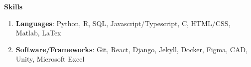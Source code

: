\documentclass[letterpaper,11pt]{article}
\newlength{\outerbordwidth}
\newcommand{\resheading}[1]{\vspace{0pt} %
  \parbox{\textwidth}{\setlength{\FrameSep}{\outerbordwidth}
    \begin{shaded}
\setlength{\fboxsep}{0pt}\framebox[\textwidth][l]{\setlength{\fboxsep}{3.5pt}\fcolorbox{shadecolorB}{shadecolorB}{\textbf{\sffamily{\mbox{~}\makebox[7.262in][l]{\large #1} \vphantom{p\^{E}}}}}} %
    \end{shaded}
  }\vspace{-7pt} %
}
\begin{document}
\vspace{-10pt}

\begin{mybox}
	\hspace{-8pt} \textbf{Skills}
\end{mybox}

\vspace{-5pt}
	\begin{enumerate}[leftmargin=10pt]
		\itemsep0em
		\item[] \textbf{Languages}: Python, R, SQL, Javascript/Typescript, C, HTML/CSS, Matlab, LaTex
		\item[] \textbf{Software/Frameworks}: Git, React, Django, Jekyll, Docker, Figma, CAD, Unity, Microsoft Excel
		
	\end{enumerate}
\end{document}

